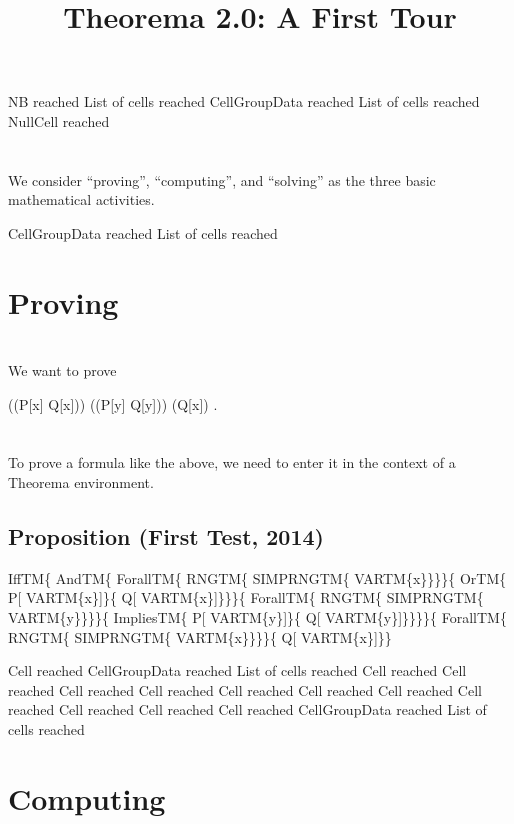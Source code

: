\documentclass{article}
\newcommand{\light}[1]{{\color{lightgray}#1}}
\begin{document}
% 

\title{Theorema 2.0: A First Tour}
\author{}
\date{}
\maketitle

\light{NB reached} \light{List of cells reached} \light{CellGroupData reached} \light{List of cells reached} Null\light{Cell reached} \begingroup \section*{} We consider “proving”, “computing”, and “solving” as the three basic mathematical activities.\endgroup 

\light{CellGroupData reached} \light{List of cells reached} \section{Proving}

\begingroup \section*{} We want to prove\endgroup 

\begin{center}((P[x] \lor Q[x])) \land ((P[y] \Rightarrow Q[y])) \Leftrightarrow (Q[x]) .\end{center}
\begingroup \section*{} To prove a formula like the above, we need to enter it in the context of a Theorema environment.\endgroup 

\begin{openenvironment}
\end{openenvironment}\begin{tmaenvironment}
\subsection{Proposition (First Test, 2014)}
 IffTM\{ AndTM\{ ForallTM\{ RNGTM\{ SIMPRNGTM\{ VARTM\{x\}\}\}\}\{ OrTM\{ P[ VARTM\{x\}]\}\{ Q[ VARTM\{x\}]\}\}\}\{ ForallTM\{ RNGTM\{ SIMPRNGTM\{ VARTM\{y\}\}\}\}\{ ImpliesTM\{ P[ VARTM\{y\}]\}\{ Q[ VARTM\{y\}]\}\}\}\}\{ ForallTM\{ RNGTM\{ SIMPRNGTM\{ VARTM\{x\}\}\}\}\{ Q[ VARTM\{x\}]\}\}\end{tmaenvironment}
\light{Cell reached} \light{CellGroupData reached} \light{List of cells reached} \light{Cell reached} \light{Cell reached} \light{Cell reached} \light{Cell reached} \light{Cell reached} \light{Cell reached} \light{Cell reached} \light{Cell reached} \light{Cell reached} \light{Cell reached} \light{Cell reached} \light{CellGroupData reached} \light{List of cells reached} \section{Computing}
\end{document}
